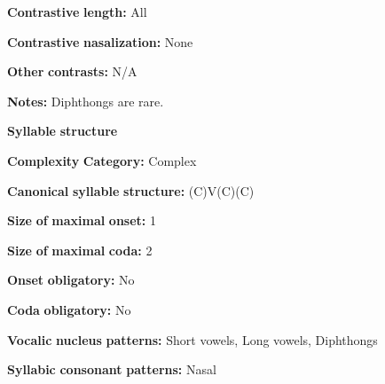 \documentclass[output=paper]{langsci/langscibook}
\begin{document}
\begin{styleBody}
\textbf{Contrastive} \textbf{length:} All
\end{styleBody}

\begin{styleBody}
\textbf{Contrastive} \textbf{nasalization:} None
\end{styleBody}

\begin{styleBody}
\textbf{Other} \textbf{contrasts:} N/A
\end{styleBody}

\begin{styleBody}
\textbf{Notes:} Diphthongs are rare.
\end{styleBody}

\begin{styleBody}
\textbf{Syllable} \textbf{structure}
\end{styleBody}

\begin{styleBody}
\textbf{Complexity} \textbf{Category:} Complex
\end{styleBody}

\begin{styleBody}
\textbf{Canonical} \textbf{syllable} \textbf{structure:} (C)V(C)(C) \citep[6-9]{Sapir1965}
\end{styleBody}

\begin{styleBody}
\textbf{Size} \textbf{of} \textbf{maximal} \textbf{onset:} 1
\end{styleBody}

\begin{styleBody}
\textbf{Size} \textbf{of} \textbf{maximal} \textbf{coda:} 2
\end{styleBody}

\begin{styleBody}
\textbf{Onset} \textbf{obligatory:} No
\end{styleBody}

\begin{styleBody}
\textbf{Coda} \textbf{obligatory:} No
\end{styleBody}

\begin{styleBody}
\textbf{Vocalic} \textbf{nucleus} \textbf{patterns:} Short vowels, Long vowels, Diphthongs
\end{styleBody}

\begin{styleBody}
\textbf{Syllabic} \textbf{consonant} \textbf{patterns:} Nasal
\end{styleBody}
\end{document}
